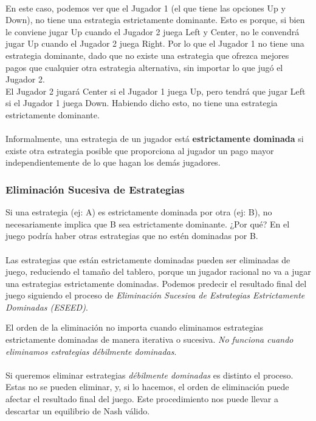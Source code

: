 \documentclass{article}
\begin{document}
                \\
                En este caso, podemos ver que el Jugador 1 (el que tiene las opciones Up y Down), no tiene una estrategia estrictamente dominante. Esto es porque, si bien le conviene jugar Up cuando el Jugador 2 juega Left y Center, no le convendrá jugar Up cuando el Jugador 2 juega Right. Por lo que el Jugador 1 no tiene una estrategia dominante, dado que no existe una estrategia que ofrezca mejores pagos que cualquier otra estrategia alternativa, sin importar lo que jugó el Jugador 2. \\
                El Jugador 2 jugará Center si el Jugador 1 juega Up, pero tendrá que jugar Left si el Jugador 1 juega Down. Habiendo dicho esto, no tiene una estrategia estrictamente dominante. \\
                \\
                Informalmente, una estrategia de un jugador está \textbf{estrictamente dominada} si existe otra estrategia posible que proporciona al jugador un pago mayor independientemente de lo que hagan los demás jugadores.
            \subsubsection*{Eliminación Sucesiva de Estrategias}
                Si una estrategia (ej: A) es estrictamente dominada por otra (ej: B), no necesariamente implica que B sea estrictamente dominante. ¿Por qué? En el juego podría haber otras estrategias que no estén dominadas por B. \\
                \\
                Las estrategias que están estrictamente dominadas pueden ser eliminadas de juego, reduciendo el tamaño del tablero, porque un jugador racional no va a jugar una estrategias estrictamente dominadas. Podemos predecir el resultado final del juego siguiendo el proceso de \emph{Eliminación Sucesiva de Estrategias Estrictamente Dominadas (ESEED)}.

                El orden de la eliminación no importa cuando eliminamos estrategias estrictamente dominadas de manera iterativa o sucesiva. \emph{No funciona cuando eliminamos estrategias débilmente dominadas}. \\
                \\
                Si queremos eliminar estrategias \emph{débilmente dominadas} es distinto el proceso. Estas no se pueden eliminar, y, si lo hacemos, el orden de eliminación puede afectar el resultado final del juego. Este procedimiento nos puede llevar a descartar un equilibrio de Nash válido. 
\end{document}
